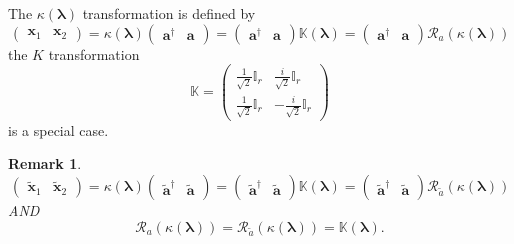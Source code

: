 \documentclass[aps, preprint]{revtex4}
\newtheorem{remark}[theorem]{Remark}
\begin{document}
The $\kappa  \left (\mathbf{\lambda }\right )$ transformation is defined by
\begin{equation}\left (\begin{array}{cc}\mathbf{x}_{1} & \mathbf{x}_{2}\end{array}\right ) =\kappa  \left (\mathbf{\lambda }\right ) \left (\begin{array}{cc}\mathbf{a}^{ \dag } & \mathbf{a}\end{array}\right ) =\left (\begin{array}{cc}\mathbf{a}^{ \dag } & \mathbf{a}\end{array}\right ) \mathbb{K} \left (\mathbf{\lambda }\right ) =\left (\begin{array}{cc}\mathbf{a}^{ \dag } & \mathbf{a}\end{array}\right ) \mathcal{R}_{a} \left (\kappa  \left (\mathbf{\lambda }\right )\right )
\end{equation}the $K$ transformation
\begin{equation}\mathbb{K} =\left (\begin{array}{cc}\frac{1}{\sqrt{2}} \mathbb{I}_{r} & \frac{i}{\sqrt{2}} \mathbb{I}_{r} \\
\frac{1}{\sqrt{2}} \mathbb{I}_{r} &  -\frac{i}{\sqrt{2}} \mathbb{I}_{r}\end{array}\right )
\end{equation}is a special case. 


\begin{remark}
\begin{equation}\left (\begin{array}{cc}\widetilde{\mathbf{x}}_{1} & \widetilde{\mathbf{x}}_{2}\end{array}\right ) =\kappa  \left (\mathbf{\lambda }\right ) \left (\begin{array}{cc}\widetilde{\mathbf{a}}^{ \dag } & \widetilde{\mathbf{a}}\end{array}\right ) =\left (\begin{array}{cc}\widetilde{\mathbf{a}}^{ \dag } & \widetilde{\mathbf{a}}\end{array}\right ) \mathbb{K} \left (\mathbf{\lambda }\right ) =\left (\begin{array}{cc}\widetilde{\mathbf{a}}^{ \dag } & \widetilde{\mathbf{a}}\end{array}\right ) \mathcal{R}_{\widetilde{a}} \left (\kappa  \left (\mathbf{\lambda }\right )\right )
\end{equation}\emph{AND}
\begin{equation}\mathcal{R}_{a} \left (\kappa  \left (\mathbf{\lambda }\right )\right ) =\mathcal{R}_{\widetilde{a}} \left (\kappa  \left (\mathbf{\lambda }\right )\right ) =\mathbb{K} \left (\mathbf{\lambda }\right )\text{.}
\end{equation}
\end{remark}
\end{document}
